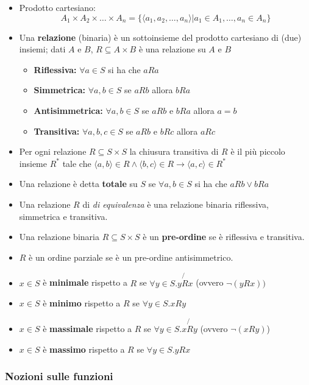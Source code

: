 \documentclass[a4paper]{article}
\begin{document}
\begin{itemize}
    \item Prodotto cartesiano:
      \[
        A_1 \times A_2 \times \dots \times A_n = \{\langle a_1,a_2,\dots,a_n \rangle | a_1 \in A_1,\dots, a_n \in A_n\}
      \]
    \item Una \textbf{relazione} (binaria) è un sottoinsieme del prodotto cartesiano di (due) insiemi; dati $A$ e $B$, $R \subseteq A \times B$ 
    è una relazione su $A$ e $B$ 
    \begin{itemize}
        \item \textbf{Riflessiva:} $\forall a \in S$ si ha che $aRa$
        \item \textbf{Simmetrica:} $\forall a,b \in S$ se $aRb$ allora $bRa$
        \item \textbf{Antisimmetrica:} $\forall a,b \in S$ se $aRb$ e $bRa$ allora $a=b$
        \item \textbf{Transitiva:} $\forall a,b,c \in S$ se $aRb$ e $bRc$ allora $aRc$
    \end{itemize}  
    \item Per ogni relazione $R \subseteq S \times S$ la chiusura transitiva di $R$ è il più piccolo 
    insieme $R^*$ tale che $\langle a,b \rangle \in R \land \langle b,c \rangle \in R \rightarrow \langle a,c \rangle \in R^*$  
    \item Una relazione è detta \textbf{totale} su $S$ se $\forall a,b \in S$ si ha che $aRb \lor bRa$
    \item Una relazione $R$ di \textit{di equivalenza} è una relazione binaria riflessiva, simmetrica e transitiva.
    \item Una relazione binaria $R \subseteq S \times S$ è un \textbf{pre-ordine} se è riflessiva e transitiva.
    \item $R$ è un ordine parziale se è un pre-ordine antisimmetrico.
    \item $x \in S$ è \textbf{minimale} rispetto a $R$ se $\forall y \in S . y \not{R} x$ (ovvero $\neg(yRx))$
    \item $x \in S$ è \textbf{minimo} rispetto a $R$ se $\forall y \in S . xRy$
    \item $x \in S$ è \textbf{massimale} rispetto a $R$ se $\forall y \in S . x \not{R} y$ (ovvero $\neg(xRy)$)
    \item $x \in S$ è \textbf{massimo} rispetto a $R$ se $\forall y \in S . yRx$
\end{itemize}

\subsubsection{Nozioni sulle funzioni}
\end{document}
